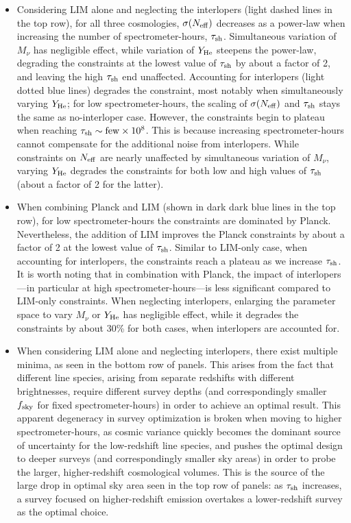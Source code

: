 \documentclass[twocolumn]{aastex631}
\begin{document}
\begin{itemize}[leftmargin=.22in,itemsep=.02in]
    \item Considering LIM alone and neglecting the interlopers (light dashed lines in the top row), for all three cosmologies, $\sigma(N_{\rm eff})$ decreases as a power-law when increasing the number of spectrometer-hours, $\tau_{\rm sh}$. Simultaneous variation of $M_\nu$ has negligible effect, while variation of $Y_{\rm He}$ steepens the power-law, degrading the constraints at the lowest value of $\tau_{\rm sh}$ by about a factor of 2, and leaving the high $\tau_{\rm sh}$ end unaffected. Accounting for interlopers (light dotted blue lines) degrades the constraint, most notably when simultaneously varying $Y_{\rm He}$; for low spectrometer-hours, the scaling of $\sigma(N_{\rm eff})$ and $\tau_{\rm sh}$ stays the same as no-interloper case. However, the constraints begin to plateau when reaching $\tau_{\rm sh} \sim {\rm few} \times10^8$. This is because increasing spectrometer-hours cannot compensate for the additional noise from interlopers. While constraints on $N_{\rm eff}$ are nearly unaffected by simultaneous variation of $M_\nu$, varying $Y_{\rm He}$ degrades the constraints for both low and high values  of $\tau_{\rm sh}$ (about a factor of 2 for the latter). 
    \item When combining Planck and LIM (shown in dark dark blue lines in the top row), for low spectrometer-hours the constraints are dominated by Planck. Nevertheless, the addition of LIM improves the Planck constraints by about a factor of 2 at the lowest value of $\tau_{\rm sh}$. Similar to LIM-only case, when accounting for interlopers, the constraints reach a plateau as we increase $\tau_{\rm sh}$. It is worth noting that in combination with Planck, the impact of interlopers---in particular at high spectrometer-hours---is less significant compared to LIM-only constraints. When neglecting interlopers, enlarging the parameter space to vary $M_\nu$ or $Y_{\rm He}$ has negligible effect, while it degrades the constraints by about 30\% for both cases, when interlopers are accounted for.
    \item When considering LIM alone and neglecting interlopers, there exist multiple minima, as seen in the bottom row of panels. This arises from the fact that different line species, arising from separate redshifts with different brightnesses, require different survey depths (and correspondingly smaller $f_{\rm sky}$ for fixed spectrometer-hours) in order to achieve an optimal result. This apparent degeneracy in survey optimization is broken when moving to higher spectrometer-hours, as cosmic variance quickly becomes the dominant source of uncertainty for the low-redshift line species, and pushes the optimal design to deeper surveys (and correspondingly smaller sky areas) in order to probe the larger, higher-redshift cosmological volumes. This is the source of the large drop in optimal sky area seen in the top row of panels: as $\tau_{\rm sh}$ increases, a survey focused on higher-redshift emission overtakes a lower-redshift survey as the optimal choice.     

\end{itemize}
\end{document}
